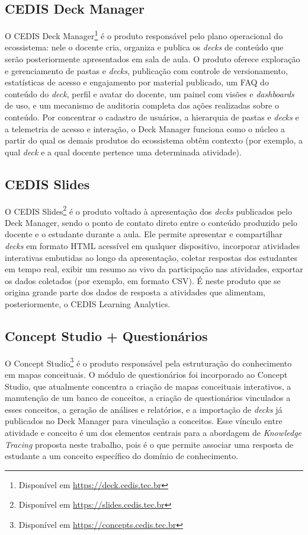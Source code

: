 \subsection{CEDIS Deck Manager}
\label{subsec:deck-manager}

O CEDIS Deck Manager\footnote{Disponível em \url{https://deck.cedis.tec.br}} é o produto
responsável pelo plano operacional do ecossistema: nele o docente cria,
organiza e publica os \textit{decks} de conteúdo que serão posteriormente
apresentados em sala de aula. O produto oferece exploração e gerenciamento
de pastas e \textit{decks}, publicação com controle de versionamento,
estatísticas de acesso e engajamento por material publicado, um FAQ do
conteúdo do \textit{deck}, perfil e avatar do docente, um painel com
visões e \textit{dashboards} de uso, e um mecanismo de auditoria completa
das ações realizadas sobre o conteúdo. Por concentrar o cadastro de
usuários, a hierarquia de pastas e \textit{decks} e a telemetria de acesso
e interação, o Deck Manager funciona como o núcleo a partir do qual os
demais produtos do ecossistema obtêm contexto (por exemplo, a qual
\textit{deck} e a qual docente pertence uma determinada atividade).

\subsection{CEDIS Slides}
\label{subsec:slides}

O CEDIS Slides\footnote{Disponível em \url{https://slides.cedis.tec.br}} é o produto voltado à
apresentação dos \textit{decks} publicados pelo Deck Manager, sendo o
ponto de contato direto entre o conteúdo produzido pelo docente e o estudante
durante a aula. Ele permite apresentar e compartilhar \textit{decks} em
formato HTML acessível em qualquer dispositivo, incorporar atividades
interativas embutidas ao longo da apresentação, coletar respostas dos
estudantes em tempo real, exibir um resumo ao vivo da participação nas atividades,
exportar os dados coletados (por exemplo, em formato CSV). É neste
produto que se origina grande parte dos dados de resposta a atividades
que alimentam, posteriormente, o CEDIS Learning Analytics.

\subsection{Concept Studio + Questionários}
\label{subsec:concept-studio}

O Concept Studio\footnote{Disponível em \url{https://concepts.cedis.tec.br}} é o produto
responsável pela estruturação do conhecimento em mapas conceituais.
O módulo de questionários foi incorporado ao Concept Studio, que 
atualmente concentra a criação de mapas conceituais interativos, a
manutenção de um banco de conceitos, a criação de questionários vinculados
a esses conceitos, a geração de análises e relatórios, e a importação de
\textit{decks} já publicados no Deck Manager para vinculação a conceitos.
Esse vínculo entre atividade e conceito é um dos elementos centrais para a
abordagem de \textit{Knowledge Tracing} proposta neste trabalho, pois é o
que permite associar uma resposta de estudante a um conceito específico do domínio
de conhecimento.

